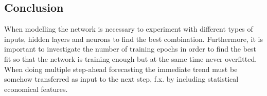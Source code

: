 \subsection{Conclusion}
When modelling the network is necessary to experiment with different types of inputs, hidden layers and neurons to find the best combination. Furthermore, it is important to investigate the number of training epochs in order to find the best fit so that the network is training enough but at the same time never overfitted. 
When doing multiple step-ahead forecasting the immediate trend must be somehow transferred as input to the next step, f.x. by including statistical economical features.

 